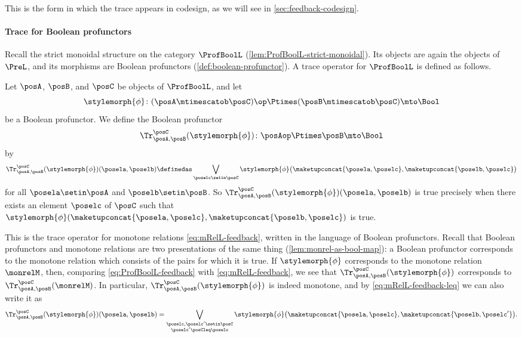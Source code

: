 This is the form in which the trace appears in codesign, as we will see in \cref{sec:feedback-codesign}.

\paragraph{Trace for Boolean profunctors}
\label{sec:trace-ProfBoolL}

Recall the strict monoidal structure on the category $\ProfBoolL$ (\cref{lem:ProfBoolL-strict-monoidal}).
Its objects are again the objects of $\PreL$, and its morphisms are Boolean profunctors (\cref{def:boolean-profunctor}).
A trace operator for $\ProfBoolL$ is defined as follows.

Let $\posA$, $\posB$, and $\posC$ be objects of $\ProfBoolL$, and let
\begin{equation}
    \stylemorph{\phi} \colon (\posA \mtimescatob \posC)\op \Ptimes (\posB \mtimescatob \posC) \mto \Bool
\end{equation}
be a Boolean profunctor.
We define the Boolean profunctor
\begin{equation}
    \Tr_{\posA,\posB}^{\posC}(\stylemorph{\phi}) \colon \posAop \Ptimes \posB \mto \Bool
\end{equation}
by
\begin{equation}
    \label{eq:ProfBoolL-feedback}
    \Tr_{\posA,\posB}^{\posC}(\stylemorph{\phi})(\posela, \poselb)
    \definedas
    \bigvee_{\poselc \setin \posC} \stylemorph{\phi}\bigl(\maketupconcat{\posela, \poselc}, \maketupconcat{\poselb, \poselc}\bigr)
\end{equation}
for all $\posela \setin \posA$ and $\poselb \setin \posB$.
So $\Tr_{\posA,\posB}^{\posC}(\stylemorph{\phi})(\posela, \poselb)$ is true precisely when there exists an element $\poselc$ of $\posC$ such that $\stylemorph{\phi}(\maketupconcat{\posela, \poselc}, \maketupconcat{\poselb, \poselc})$ is true.

This is the trace operator for monotone relations \cref{eq:mRelL-feedback}, written in the language of Boolean profunctors.
Recall that Boolean profunctors and monotone relations are two presentations of the same thing (\cref{lem:monrel-as-bool-map}): a Boolean profunctor corresponds to the monotone relation which consists of the pairs for which it is true.
If $\stylemorph{\phi}$ corresponds to the monotone relation $\monrelM$, then, comparing \cref{eq:ProfBoolL-feedback} with \cref{eq:mRelL-feedback}, we see that $\Tr_{\posA,\posB}^{\posC}(\stylemorph{\phi})$ corresponds to $\Tr_{\posA,\posB}^{\posC}(\monrelM)$.
In particular, $\Tr_{\posA,\posB}^{\posC}(\stylemorph{\phi})$ is indeed monotone, and by \cref{eq:mRelL-feedback-leq} we can also write it as
\begin{equation}
    \label{eq:ProfBoolL-feedback-leq}
    \Tr_{\posA,\posB}^{\posC}(\stylemorph{\phi})(\posela, \poselb)
    =
    \bigvee_{\substack{\poselc, \poselc' \setin \posC \\ \poselc' \posCleq \poselc}} \stylemorph{\phi}\bigl(\maketupconcat{\posela, \poselc}, \maketupconcat{\poselb, \poselc'}\bigr).
\end{equation}

